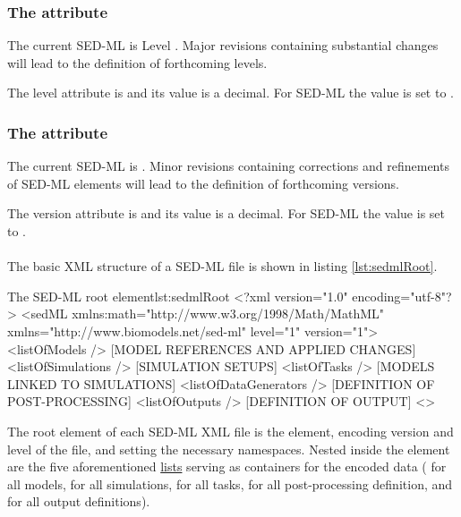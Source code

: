 \subsubsection{The  attribute}
\label{sec:level}

The current SED-ML  is Level \level. Major revisions containing substantial changes will lead to the definition of forthcoming levels.

The level attribute is  and its value is a  decimal. For SED-ML \LoneVone the value is set to .

\subsubsection{The  attribute}
\label{sec:version}
The current SED-ML  is \version. Minor revisions containing corrections and refinements of SED-ML elements will lead to the definition of forthcoming versions.

The version attribute is  and its value is a  decimal. For SED-ML \LoneVone the value is set to .

\paragraph*{}

The basic XML structure of a SED-ML file is shown in listing  \ref{lst:sedmlRoot}.
%
\begin{myXmlLst}{The SED-ML root element}{lst:sedmlRoot}
<?xml version="1.0" encoding="utf-8"?>
<sedML xmlns:math="http://www.w3.org/1998/Math/MathML" 
       xmlns="http://www.biomodels.net/sed-ml" 
       level="1"
       version="1">
 <listOfModels />
  [MODEL REFERENCES AND APPLIED CHANGES]
 <listOfSimulations />
  [SIMULATION SETUPS]
 <listOfTasks />
  [MODELS LINKED TO SIMULATIONS]
 <listOfDataGenerators />
  [DEFINITION OF POST-PROCESSING]
 <listOfOutputs />
  [DEFINITION OF OUTPUT]
<\sedML>
\end{myXmlLst}
%
The root element of each SED-ML XML file is the  element, encoding version and level of the file, and setting the necessary namespaces. Nested inside the  element are the five aforementioned \hyperref[sec:listOfElements]{lists} serving as containers for the encoded data ( for all models,  for all simulations,  for all tasks,  for all post-processing definition, and  for all output definitions).


